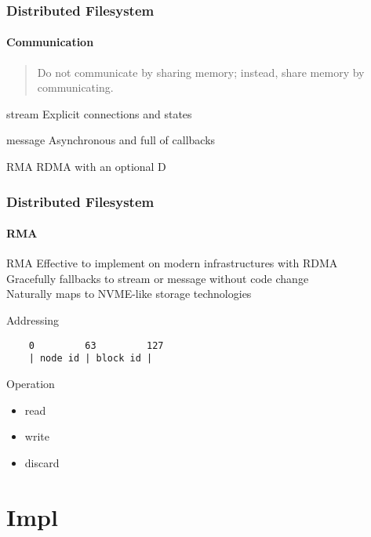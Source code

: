 \documentclass{ctexbeamer}
\begin{document}
\begin{frame}
\frametitle{Distributed Filesystem}
\framesubtitle{Communication}
\begin{verse}
  Do not communicate by sharing memory; instead, share memory by communicating.
\end{verse}
\begin{block}{stream}
  Explicit connections and states
\end{block}
\begin{block}{message}
  Asynchronous and full of callbacks
\end{block}
\begin{exampleblock}{RMA}
  RDMA with an optional D
\end{exampleblock}
\end{frame}

\begin{frame}[fragile]
\frametitle{Distributed Filesystem}
\framesubtitle{RMA}
  \begin{exampleblock}{RMA}
    Effective to implement on modern infrastructures with RDMA \\
    Gracefully fallbacks to stream or message without code change \\
    Naturally maps to NVME-like storage technologies \\
  \end{exampleblock}
  \begin{block}{Addressing}
    \begin{small}
    \begin{verbatim}
    0         63         127
    | node id | block id | \end{verbatim}
    \end{small}
  \end{block}
  \begin{block}{Operation}
    \begin{itemize}
       \item read
       \item write 
       \item discard
    \end{itemize}
  \end{block}
\end{frame}

\section{Impl}

\section{}
\frame{\titlepage}
\end{document}
